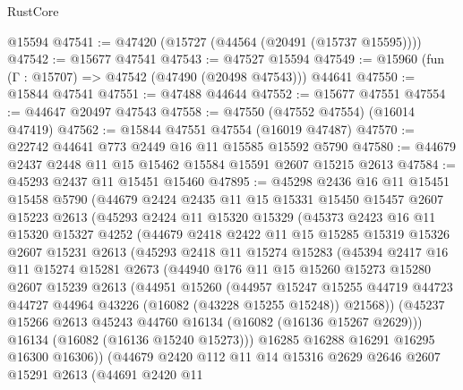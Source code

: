 \begin{lexlean}{RustCore}
\begin{coremodule}
    @15594
@47541 := @47420 (@15727 (@44564 (@20491 (@15737 @15595))))
@47542 := @15677 @47541
@47543 := @47527 @15594
@47549 := @15960 (fun (Γ : @15707) => @47542 (@47490 (@20498 @47543))) @44641
@47550 := @15844 @47541
@47551 := @47488 @44644
@47552 := @15677 @47551
@47554 := @44647 @20497 @47543
@47558 := @47550 (@47552 @47554) (@16014 @47419)
@47562 := @15844 @47551 @47554 (@16019 @47487)
@47570 := @22742 @44641 @773 @2449 @16 @11 @15585 @15592 @5790
@47580 := @44679 @2437 @2448 @11 @15 @15462 @15584 @15591 @2607 @15215 @2613
@47584 := @45293 @2437 @11 @15451 @15460
@47895 := @45298
    @2436
    @16
    @11
    @15451
    @15458
    @5790
    (@44679
      @2424
      @2435
      @11
      @15
      @15331
      @15450
      @15457
      @2607
      @15223
      @2613
      (@45293
        @2424
        @11
        @15320
        @15329
        (@45373
          @2423
          @16
          @11
          @15320
          @15327
          @4252
          (@44679
            @2418
            @2422
            @11
            @15
            @15285
            @15319
            @15326
            @2607
            @15231
            @2613
            (@45293
              @2418
              @11
              @15274
              @15283
              (@45394
                @2417
                @16
                @11
                @15274
                @15281
                @2673
                (@44940
                  @176
                  @11
                  @15
                  @15260
                  @15273
                  @15280
                  @2607
                  @15239
                  @2613
                  (@44951
                    @15260
                    (@44957
                      @15247
                      @15255
                      @44719
                      @44723
                      @44727
                      @44964
                      @43226
                      (@16082 (@43228 @15255 @15248))
                      @21568))
                  (@45237 @15266 @2613 @45243 @44760 @16134 (@16082 (@16136 @15267 @2629)))
                  @16134
                  (@16082 (@16136 @15240 @15273)))
                @16285
                @16288
                @16291
                @16295
                @16300
                @16306))
            (@44679
              @2420
              @112
              @11
              @14
              @15316
              @2629
              @2646
              @2607
              @15291
              @2613
              (@44691
                @2420
                @11

\end{coremodule}
\end{lexlean}
